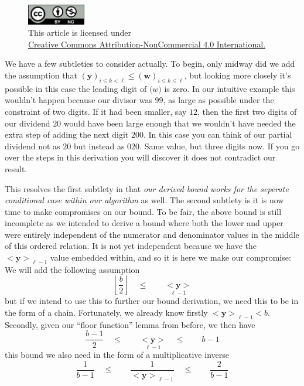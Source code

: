 \documentclass[twoside]{article}
\renewcommand{\leq}{\ensuremath{\quad\le\qquad}}
\newcommand{\bseq}[1][u]{\ensuremath{<\!\!\bm{#1}\!\!>}}
\newcommand{\bunderseq}[2][u]{\ensuremath{\underset{#2}{<\!\!\bm{#1}\!\!>}}}
\newcommand{\numer}[3][w]{\ensuremath{(\bm{#1})_{#2\le k\le #3}}}
\newcommand{\denom}[3][y]{\ensuremath{(\bm{#1})_{#2\le k <  #3}}}
\begin{document}
\begin{figure}[h]
\centering
\includegraphics[width=1in]{cc-by-nc.png}\\[0.1in]
\tiny This article is licensed under \\
\href{http://creativecommons.org/licenses/by-nc/4.0/}
{Creative Commons Attribution-NonCommercial 4.0 International.}\\[0.3in]
\end{figure}

We have a few subtleties to consider actually. To begin, only midway did we add the assumption that
$ \denom{i}{\ell}\le\numer{i}{\ell} $, but looking more closely it's possible in this case the leading digit of $ \bm(w) $ is zero.
In our intuitive example this wouldn't happen because our divisor was $ 99 $, as large as possible under the constraint of two digits.
If it had been smaller, say $ 12 $, then the first two digits of our dividend $ 20 $ would have been large enough that we wouldn't
have needed the extra step of adding the next digit $ 200 $. In this case you can think of our partial dividend not as $ 20 $ but
instead as $ 020 $. Same value, but three digits now. If you go over the steps in this derivation you will discover it does not
contradict our result.

This resolves the first subtlety in that \emph{our derived bound works for the seperate conditional case within our algorithm} as well.
The second subtlety is it is now time to make compromises on our bound. To be fair, the above bound is still incomplete as we intended
to derive a bound where both the lower and upper were entirely independent of the numerator and denominator values in the middle of
this ordered relation. It is not yet independent because we have the $ \bseq[y]_{\ell-1} $ value embedded within, and so it is here
we make our compromise: We will add the following assumption
$$ \left\lfloor\frac{b}{2}\right\rfloor\leq\bunderseq[y]{\ell-1} $$
but if we intend to use this to further our bound derivation, we need this to be in the form of a chain. Fortunately, we already
know firstly $ \bseq[y]_{\ell-1} < b $. Secondly, given our ``floor function'' lemma from before, we then have
$$ \frac{b-1}{2}\leq\bunderseq[y]{\ell-1}\leq b-1 $$
this bound we also need in the form of a multiplicative inverse
$$ \frac{1}{b-1}\leq\frac{1}{\bseq[y]_{\ell-1}}\leq\frac{2}{b-1} $$
\end{document}
